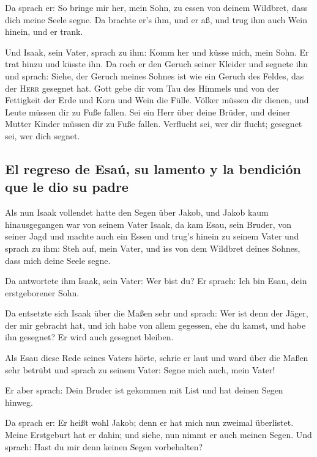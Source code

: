 Da sprach er: So bringe mir her, mein Sohn, zu essen von
deinem Wildbret, dass dich meine Seele segne. Da brachte er's ihm, und
er aß, und trug ihm auch Wein hinein, und er trank.

 Und Isaak, sein Vater, sprach zu ihm: Komm her und küsse
mich, mein Sohn.  Er trat hinzu und küsste ihn. Da roch
er den Geruch seiner Kleider und segnete ihn und sprach: Siehe, der
Geruch meines Sohnes ist wie ein Geruch des Feldes, das der
\textsc{Herr} gesegnet hat.  Gott gebe dir vom Tau des
Himmels und von der Fettigkeit der Erde und Korn und Wein die Fülle.
 Völker müssen dir dienen, und Leute müssen dir zu Fuße
fallen. Sei ein Herr über deine Brüder, und deiner Mutter Kinder müssen
dir zu Fuße fallen. Verflucht sei, wer dir flucht; gesegnet sei, wer
dich segnet.

\hypertarget{el-regreso-de-esauxfa-su-lamento-y-la-bendiciuxf3n-que-le-dio-su-padre}{%
\subsection{El regreso de Esaú, su lamento y la bendición que le dio su
padre}\label{el-regreso-de-esauxfa-su-lamento-y-la-bendiciuxf3n-que-le-dio-su-padre}}

 Als nun Isaak vollendet hatte den Segen über Jakob, und
Jakob kaum hinausgegangen war von seinem Vater Isaak, da kam Esau, sein
Bruder, von seiner Jagd  und machte auch ein Essen und
trug's hinein zu seinem Vater und sprach zu ihm: Steh auf, mein Vater,
und iss von dem Wildbret deines Sohnes, dass mich deine Seele segne.

 Da antwortete ihm Isaak, sein Vater: Wer bist du? Er
sprach: Ich bin Esau, dein erstgeborener Sohn.

 Da entsetzte sich Isaak über die Maßen sehr und sprach:
Wer ist denn der Jäger, der mir gebracht hat, und ich habe von allem
gegessen, ehe du kamst, und habe ihn gesegnet? Er wird auch gesegnet
bleiben.

 Als Esau diese Rede seines Vaters hörte, schrie er laut
und ward über die Maßen sehr betrübt und sprach zu seinem Vater: Segne
mich auch, mein Vater!

 Er aber sprach: Dein Bruder ist gekommen mit List und
hat deinen Segen hinweg.

 Da sprach er: Er heißt wohl Jakob; denn er hat mich nun
zweimal überlistet. Meine Erstgeburt hat er dahin; und siehe, nun nimmt
er auch meinen Segen. Und sprach: Hast du mir denn keinen Segen
vorbehalten?

